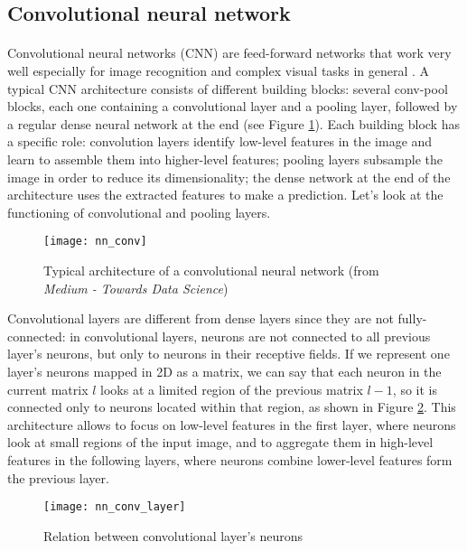 \subsection{Convolutional neural network}
\paragraph{} Convolutional neural networks (CNN) are feed-forward networks that work very well especially for image recognition and complex visual tasks in general \cite{OReilly:handsonML}. A typical CNN architecture consists of different building blocks: several conv-pool blocks, each one containing a convolutional layer and a pooling layer, followed by a regular dense neural network at the end (see Figure \ref{fig:nn_conv}). Each building block has a specific role: convolution layers identify low-level features in the image and learn to assemble them into higher-level features; pooling layers subsample the image in order to reduce its dimensionality; the dense network at the end of the architecture uses the extracted features to make a prediction. Let's look at the functioning of convolutional and pooling layers.
\begin{figure}[htbp]
    \centering
    \texttt{[image: nn\_conv]}
    \caption{Typical architecture of a convolutional neural network (from \textit{Medium - Towards Data Science})}
    \label{fig:nn_conv}
\end{figure}

Convolutional layers are different from dense layers since they are not fully-connected: in convolutional layers, neurons are not connected to all previous layer's neurons, but only to neurons in their receptive fields. If we represent one layer's neurons mapped in 2D as a matrix, we can say that each neuron in the current matrix $l$ looks at a limited region of the previous matrix $l-1$, so it is connected only to neurons located within that region, as shown in Figure \ref{fig:nn_conv_layer}. This architecture allows to focus on low-level features in the first layer, where neurons look at small regions of the input image, and to aggregate them in high-level features in the following layers, where neurons combine lower-level features form the previous layer.
\begin{figure}[htbp]
    \centering
    \texttt{[image: nn\_conv\_layer]}
    \caption{Relation between convolutional layer's neurons}
    \label{fig:nn_conv_layer}
\end{figure}

